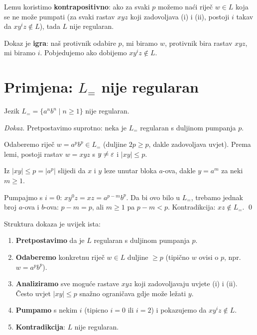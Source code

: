 \begin{kljucno}
Lemu koristimo \textbf{kontrapositivno}: ako za svaki $p$ možemo
naći riječ $w \in L$ koja se ne može pumpati (za svaki rastav
$xyz$ koji zadovoljava (i) i (ii), postoji $i$ takav da
$xy^iz \notin L$), tada $L$ nije regularan.

Dokaz je \textbf{igra}: naš protivnik odabire $p$, mi biramo $w$,
protivnik bira rastav $xyz$, mi biramo $i$. Pobjedujemo ako dobijemo
$xy^iz \notin L$.
\end{kljucno}

\section{Primjena: $L_=$ nije regularan}

\begin{propozicija}
Jezik $L_= = \{a^n b^n \mid n \geq 1\}$ nije regularan.
\end{propozicija}

\textit{Dokaz.}
Pretpostavimo suprotno: neka je $L_=$ regularan s duljinom pumpanja $p$.

Odaberemo riječ $w = a^p b^p \in L_=$ (duljine $2p \geq p$, dakle
zadovoljava uvjet). Prema lemi, postoji rastav $w = xyz$ s
$y \neq \varepsilon$ i $|xy| \leq p$.

Iz $|xy| \leq p = |a^p|$ slijedi da $x$ i $y$ leze unutar bloka $a$-ova,
dakle $y = a^m$ za neki $m \geq 1$.

Pumpajmo s $i = 0$: $xy^0z = xz = a^{p-m}b^p$. Da bi ovo bilo u $L_=$,
trebamo jednak broj $a$-ova i $b$-ova: $p - m = p$, ali $m \geq 1$
pa $p - m < p$. Kontradikcija: $xz \notin L_=$. \qed

\begin{primjer}
Struktura dokaza je uvijek ista:
\begin{enumerate}
  \item \textbf{Pretpostavimo} da je $L$ regularan s duljinom pumpanja $p$.
    \item \textbf{Odaberemo} konkretnu riječ $w \in L$ duljine $\geq p$
      (tipično $w$ ovisi o $p$, npr.\ $w = a^p b^p$).
    \item \textbf{Analiziramo} sve moguće rastave $xyz$ koji zadovoljavaju
      uvjete (i) i (ii). Često uvjet $|xy| \leq p$ snažno ograničava
      gdje može ležati $y$.
  \item \textbf{Pumpamo} s nekim $i$ (tipicno $i = 0$ ili $i = 2$) i
        pokazujemo da $xy^i z \notin L$.
  \item \textbf{Kontradikcija}: $L$ nije regularan.
\end{enumerate}
\end{primjer}

